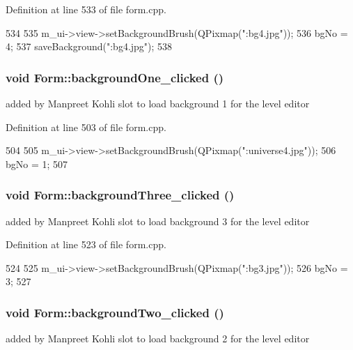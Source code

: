 Definition at line 533 of file form.cpp.


\begin{DoxyCode}
534 {
535     m_ui->view->setBackgroundBrush(QPixmap(":bg4.jpg"));
536     bgNo = 4;
537     saveBackground(":bg4.jpg");
538 }
\end{DoxyCode}
\hypertarget{class_form_a5cdef71302be379ec9c2e2fc037f9f2f}{
\subsubsection[{backgroundOne\_\-clicked}]{\setlength{\rightskip}{0pt plus 5cm}void Form::backgroundOne\_\-clicked ()}}
\label{class_form_a5cdef71302be379ec9c2e2fc037f9f2f}
added by Manpreet Kohli slot to load background 1 for the level editor 

Definition at line 503 of file form.cpp.


\begin{DoxyCode}
504 {
505     m_ui->view->setBackgroundBrush(QPixmap(":universe4.jpg"));
506     bgNo = 1;
507     }
\end{DoxyCode}
\hypertarget{class_form_ade0ebe9daab69d9c6cdd2928fb8ce122}{
\subsubsection[{backgroundThree\_\-clicked}]{\setlength{\rightskip}{0pt plus 5cm}void Form::backgroundThree\_\-clicked ()}}
\label{class_form_ade0ebe9daab69d9c6cdd2928fb8ce122}
added by Manpreet Kohli slot to load background 3 for the level editor 

Definition at line 523 of file form.cpp.


\begin{DoxyCode}
524 {
525     m_ui->view->setBackgroundBrush(QPixmap(":bg3.jpg"));
526     bgNo = 3;
527 }
\end{DoxyCode}
\hypertarget{class_form_a8344660630a52616f758765097813580}{
\subsubsection[{backgroundTwo\_\-clicked}]{\setlength{\rightskip}{0pt plus 5cm}void Form::backgroundTwo\_\-clicked ()}}
\label{class_form_a8344660630a52616f758765097813580}
added by Manpreet Kohli slot to load background 2 for the level editor 


